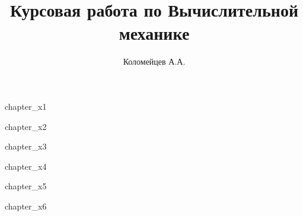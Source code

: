 \documentclass[a4paper,12pt,russian]{extreport}
\author{Коломейцев А.А.}
\title{Курсовая работа по Вычислительной механике}
\affil{НИУ "МЭИ"}
\newcommand{\includechapter}[1]{{chapter_#1}\newpage}
\newcommand{\includebiblio}[1]{
    \begingroup
    \renewcommand{\chapter}[2]{
        \clearpage
        \stepcounter{chapter}
        \centering\paragraph{\MakeUppercase{Библиографический список}}
        \addcontentsline{toc}{likechapter}{\MakeUppercase{Библиографический список}}
    }
    \let\bibfont\protect\normalsize
    
    \endgroup
}
\begin{document}
\setcounter{page}{2}

\tableofcontents\newpage

\includechapter{x1} %

\includechapter{x2} %

\includechapter{x3} %

\includechapter{x4} %

\includechapter{x5} %

\includechapter{x6} %

\end{document}
